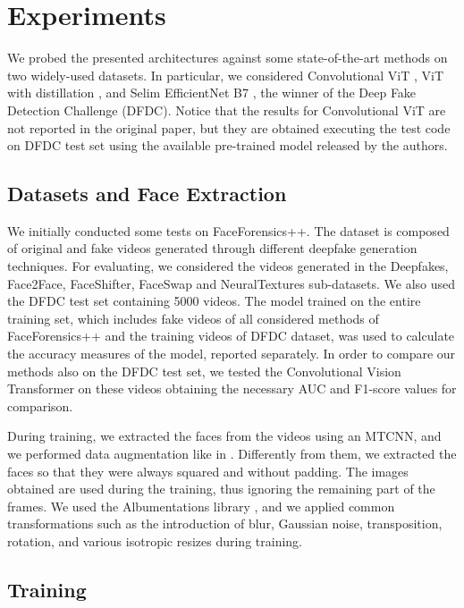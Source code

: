 \documentclass[runningheads]{llncs}
\begin{document}
\section{Experiments}

We probed the presented architectures against some state-of-the-art methods on two widely-used datasets. In particular, we considered Convolutional ViT \cite{wodajo2021deepfake}, ViT with distillation \cite{heo2021deepfake}, and Selim EfficientNet B7 \cite{dfdc_solution}, the winner of the Deep Fake Detection Challenge (DFDC).
Notice that the results for Convolutional ViT \cite{wodajo2021deepfake} are not reported in the original paper, but they are obtained executing the test code on DFDC test set using the available pre-trained model released by the authors.

\subsection{Datasets and Face Extraction}



We initially conducted some tests on FaceForensics++. The dataset is composed of original and fake videos generated through different deepfake generation techniques. For evaluating, we considered the videos generated in the Deepfakes, Face2Face, FaceShifter, FaceSwap and NeuralTextures sub-datasets. We also used the DFDC test set containing 5000 videos. The model trained on the entire training set, which includes fake videos of all considered methods of FaceForensics++ and the training videos of DFDC dataset, was used to calculate the accuracy measures of the model, reported separately. In order to compare our methods also on the DFDC test set, we tested the Convolutional Vision Transformer \cite{wodajo2021deepfake} on these videos obtaining the necessary AUC and F1-score values for comparison.


During training, we extracted the faces from the videos using an MTCNN, and we performed data augmentation like in \cite{dfdc_solution}. Differently from them, we extracted the faces so that they were always squared and without padding. The images obtained are used during the training, thus ignoring the remaining part of the frames.
We used the Albumentations library \cite{2018arXiv180906839B}, and we applied common transformations such as the introduction of blur, Gaussian noise, transposition, rotation, and various isotropic resizes during training. 

\subsection{Training}
\end{document}
